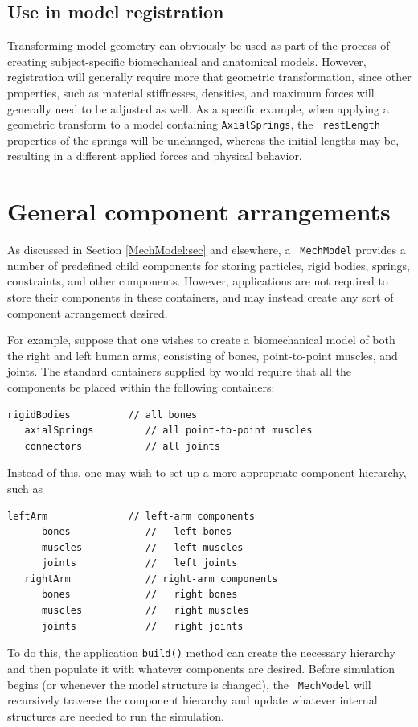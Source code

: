 \subsection{Use in model registration}

Transforming model geometry can obviously be used as part of the
process of creating subject-specific biomechanical and anatomical
models. However, registration will generally require more that
geometric transformation, since other properties, such as material
stiffnesses, densities, and maximum forces will generally need to be
adjusted as well. As a specific example, when applying a geometric
transform to a model containing {\tt AxialSprings}, the {\tt
restLength} properties of the springs will be unchanged, whereas the
initial lengths may be, resulting in a different applied forces and
physical behavior.

\section{General component arrangements}

As discussed in Section \ref{MechModel:sec} and elsewhere, a {\tt
MechModel} provides a number of predefined child components for
storing particles, rigid bodies, springs, constraints, and other
components.  However, applications are not required to store their
components in these containers, and may instead create any sort of
component arrangement desired.

For example, suppose that one wishes to create a biomechanical model
of both the right and left human arms, consisting of bones,
point-to-point muscles, and joints. The standard containers supplied
by  would require that
all the components be placed within the following containers:
%
\begin{lstlisting}[]
   rigidBodies          // all bones
   axialSprings         // all point-to-point muscles
   connectors           // all joints
\end{lstlisting}
%
Instead of this, one may wish to set up a more appropriate component
hierarchy, such as
%
\begin{lstlisting}[]
   leftArm              // left-arm components
      bones             //   left bones
      muscles           //   left muscles
      joints            //   left joints
   rightArm             // right-arm components
      bones             //   right bones
      muscles           //   right muscles
      joints            //   right joints
\end{lstlisting}
%
To do this, the application {\tt build()} method can create the
necessary hierarchy and then
populate it with whatever components are desired.  Before simulation
begins (or whenever the model structure is changed), the {\tt
MechModel} will recursively traverse the component hierarchy and
update whatever internal structures are needed to run the
simulation.

